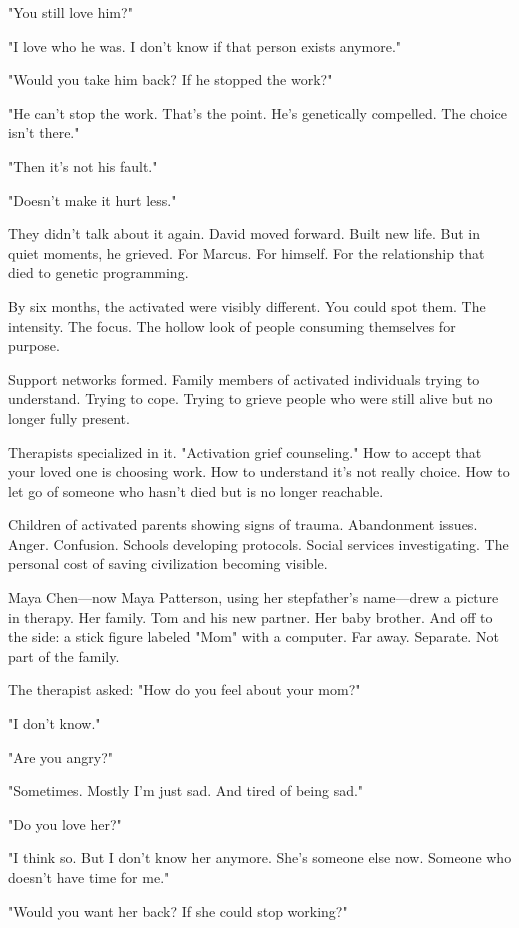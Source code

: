 "You still love him?"

"I love who he was. I don't know if that person exists anymore."

"Would you take him back? If he stopped the work?"

"He can't stop the work. That's the point. He's genetically compelled. The choice isn't there."

"Then it's not his fault."

"Doesn't make it hurt less."

They didn't talk about it again. David moved forward. Built new life. But in quiet moments, he grieved. For Marcus. For himself. For the relationship that died to genetic programming.

\scenebreak

By six months, the activated were visibly different. You could spot them. The intensity. The focus. The hollow look of people consuming themselves for purpose.

Support networks formed. Family members of activated individuals trying to understand. Trying to cope. Trying to grieve people who were still alive but no longer fully present.

Therapists specialized in it. "Activation grief counseling." How to accept that your loved one is choosing work. How to understand it's not really choice. How to let go of someone who hasn't died but is no longer reachable.

Children of activated parents showing signs of trauma. Abandonment issues. Anger. Confusion. Schools developing protocols. Social services investigating. The personal cost of saving civilization becoming visible.

Maya Chen—now Maya Patterson, using her stepfather's name—drew a picture in therapy. Her family. Tom and his new partner. Her baby brother. And off to the side: a stick figure labeled "Mom" with a computer. Far away. Separate. Not part of the family.

The therapist asked: "How do you feel about your mom?"

"I don't know."

"Are you angry?"

"Sometimes. Mostly I'm just sad. And tired of being sad."

"Do you love her?"

"I think so. But I don't know her anymore. She's someone else now. Someone who doesn't have time for me."

"Would you want her back? If she could stop working?"

